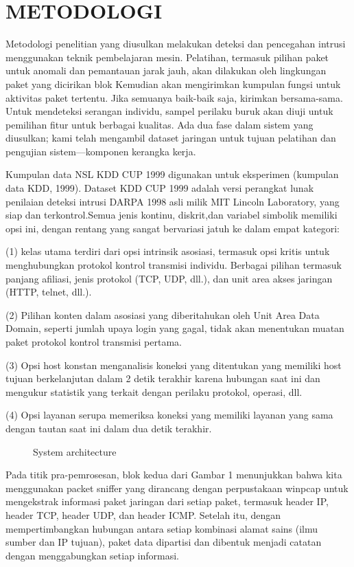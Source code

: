\documentclass[conference]{IEEEtran}
\begin{document}
\section{METODOLOGI}
Metodologi penelitian yang diusulkan melakukan deteksi dan pencegahan intrusi menggunakan teknik pembelajaran mesin. Pelatihan, termasuk pilihan paket untuk anomali dan pemantauan jarak jauh, akan dilakukan oleh lingkungan paket yang dicirikan blok Kemudian akan mengirimkan kumpulan fungsi untuk aktivitas paket tertentu. Jika semuanya baik-baik saja, kirimkan bersama-sama. Untuk mendeteksi serangan individu, sampel perilaku buruk akan diuji untuk pemilihan fitur untuk berbagai
kualitas. Ada dua fase dalam sistem yang diusulkan; kami telah mengambil dataset jaringan untuk tujuan pelatihan dan pengujian sistem—komponen kerangka kerja.

Kumpulan data NSL KDD CUP 1999 digunakan untuk eksperimen (kumpulan data KDD, 1999). Dataset KDD CUP 1999 adalah versi perangkat lunak penilaian deteksi intrusi DARPA 1998 asli milik MIT Lincoln Laboratory, yang siap dan terkontrol.Semua jenis kontinu, diskrit,dan variabel simbolik memiliki opsi ini, dengan rentang yang sangat bervariasi jatuh ke dalam empat kategori:

(1) kelas utama terdiri dari opsi intrinsik asosiasi, termasuk opsi kritis untuk menghubungkan protokol kontrol transmisi individu. Berbagai pilihan termasuk panjang afiliasi, jenis protokol (TCP, UDP, dll.), dan unit area akses jaringan (HTTP, telnet, dll.).

(2) Pilihan konten dalam asosiasi yang diberitahukan oleh Unit Area Data Domain, seperti jumlah upaya login yang gagal, tidak akan menentukan muatan paket protokol kontrol transmisi pertama. 

(3) Opsi host konstan menganalisis koneksi yang ditentukan yang memiliki host tujuan berkelanjutan dalam 2 detik terakhir karena hubungan saat ini dan mengukur statistik yang terkait dengan perilaku protokol, operasi, dll.

(4) Opsi layanan serupa memeriksa koneksi yang memiliki layanan yang sama dengan tautan saat ini dalam dua detik terakhir.

\begin{figure}
\centering
\scalebox{0.65}{}
\caption{System architecture}
\end{figure}

Pada titik pra-pemrosesan, blok kedua dari Gambar 1 menunjukkan bahwa kita menggunakan packet sniffer yang dirancang dengan perpustakaan winpcap untuk mengekstrak informasi paket jaringan dari setiap paket, termasuk header IP, header TCP, header UDP, dan header ICMP. Setelah itu, dengan mempertimbangkan hubungan antara setiap kombinasi alamat sains (ilmu sumber dan IP tujuan), paket data dipartisi dan dibentuk menjadi catatan dengan menggabungkan setiap informasi.
\end{document}
